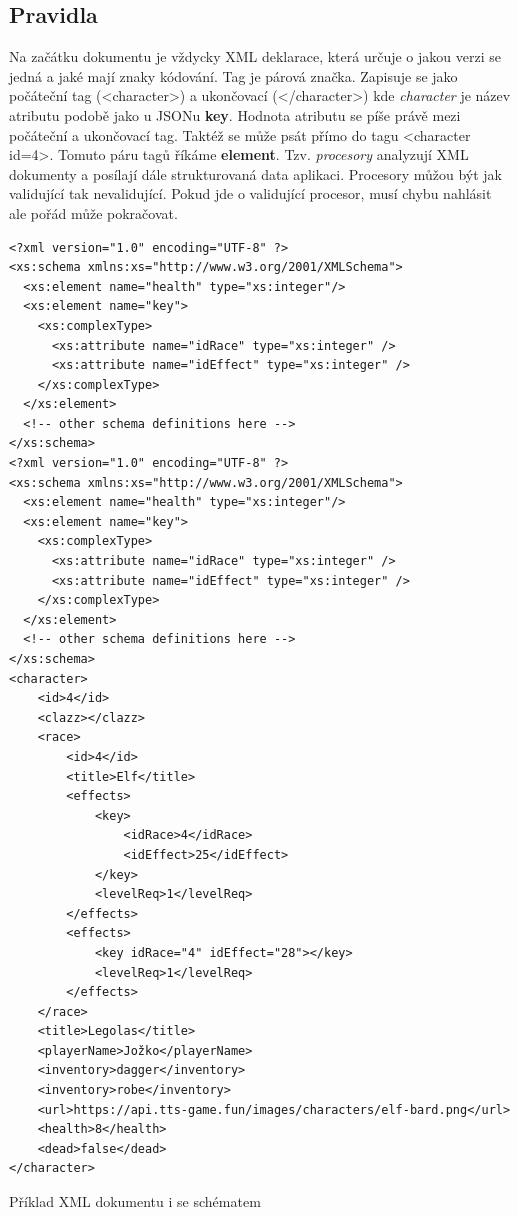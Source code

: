 \subsection{Pravidla}
Na začátku dokumentu je vždycky XML deklarace, která určuje o jakou verzi se jedná a jaké mají znaky kódování.
Tag je párová značka. Zapisuje se jako počáteční tag (<character>) a ukončovací (</character>) kde \textit{character} je název atributu podobě jako u JSONu \textbf{key}. Hodnota atributu se píše právě mezi počáteční a ukončovací tag. Taktéž se může psát přímo do tagu <character id=4>. Tomuto páru tagů říkáme \textbf{element}. Tzv. \textit{procesory} analyzují XML dokumenty a posílají dále strukturovaná data aplikaci. Procesory můžou být jak validující tak nevalidující. Pokud jde o validující procesor, musí chybu nahlásit ale pořád může pokračovat.


\begin{listing}
  \begin{verbatim}
<?xml version="1.0" encoding="UTF-8" ?>
<xs:schema xmlns:xs="http://www.w3.org/2001/XMLSchema">
  <xs:element name="health" type="xs:integer"/>
  <xs:element name="key">
    <xs:complexType>
      <xs:attribute name="idRace" type="xs:integer" />
      <xs:attribute name="idEffect" type="xs:integer" />
    </xs:complexType>
  </xs:element>
  <!-- other schema definitions here -->
</xs:schema>
<?xml version="1.0" encoding="UTF-8" ?>
<xs:schema xmlns:xs="http://www.w3.org/2001/XMLSchema">
  <xs:element name="health" type="xs:integer"/>
  <xs:element name="key">
    <xs:complexType>
      <xs:attribute name="idRace" type="xs:integer" />
      <xs:attribute name="idEffect" type="xs:integer" />
    </xs:complexType>
  </xs:element>
  <!-- other schema definitions here -->
</xs:schema>
<character> 
    <id>4</id>
    <clazz></clazz>
    <race>
        <id>4</id>
        <title>Elf</title>
        <effects>
            <key>
                <idRace>4</idRace>
                <idEffect>25</idEffect>
            </key>
            <levelReq>1</levelReq>
        </effects>
        <effects>
            <key idRace="4" idEffect="28"></key>
            <levelReq>1</levelReq>
        </effects>
    </race>
    <title>Legolas</title>
    <playerName>Jožko</playerName>
    <inventory>dagger</inventory>
    <inventory>robe</inventory>
    <url>https://api.tts-game.fun/images/characters/elf-bard.png</url>
    <health>8</health>
    <dead>false</dead>
</character>
  \end{verbatim}
  \caption{Příklad XML dokumentu i se schématem}
\end{listing}

